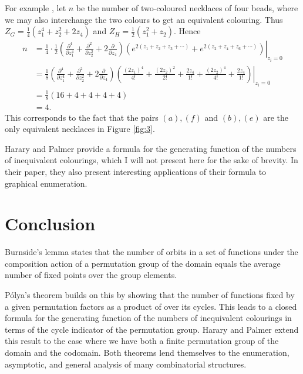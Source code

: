 \documentclass[a4paper,11pt]{article}
\numberwithin{equation}{section}
\begin{document}
    For example \cite[Exercise~10]{stanley2013}, let $n$ be the number of two-coloured necklaces of four beads, where we may also interchange the two colours to get an equivalent colouring. Thus $Z_G=\frac{1}{4}\left(z_1^4+z_2^2+2 z_4\right)$ and $Z_H=\frac{1}{2}\left(z_1^2+z_2\right)$. Hence $$\begin{aligned}
    n & =\left.\frac{1}{4} \cdot \frac{1}{2}\left(\frac{\partial^4}{\partial z_1^4}+\frac{\partial^2}{\partial z_2^2}+2 \frac{\partial}{\partial z_4}\right)\left(e^{2\left(z_1+z_2+z_3+\cdots\right)}+e^{2\left(z_2+z_4+z_6+\cdots\right)}\right)\right|_{z_i=0} \\
    & =\left.\frac{1}{8}\left(\frac{\partial^4}{\partial z_1^4}+\frac{\partial^2}{\partial z_2^2}+2 \frac{\partial}{\partial z_4}\right)\left(\frac{\left(2 z_1\right)^4}{4!}+\frac{\left(2 z_2\right)^2}{2!}+\frac{2 z_4}{1!}+\frac{\left(2 z_2\right)^4}{4!}+\frac{2 z_4}{1!}\right)\right|_{z_i=0} \\
    & =\frac{1}{8}(16+4+4+4+4) \\
    & =4.
    \end{aligned}$$
    This corresponds to the fact that the pairs $(a), (f)$ and $(b),(e)$ are the only equivalent necklaces in Figure \ref{fig:3}. \smallskip 

    Harary and Palmer \cite[Theorem 4]{HARARY1966157} provide a formula for the generating function of the numbers of inequivalent colourings, which I will not present here for the sake of brevity. In their paper, they also present interesting applications of their formula to graphical enumeration.


    \section{Conclusion} Burnside's lemma states that the number of orbits in a set of functions under the composition action of a permutation group of the domain equals the average number of fixed points over the group elements. \smallskip
    
    Pólya's theorem builds on this by showing that the number of functions fixed by a given permutation factors as a product of over its cycles. This leads to a closed formula for the generating function of the numbers of inequivalent colourings in terms of the cycle indicator of the permutation group. Harary and Palmer extend this result to the case where we have both a finite permutation group of the domain and the codomain. Both theorems lend themselves to the enumeration, asymptotic, and general analysis of many combinatorial structures. \smallskip 
\end{document}
